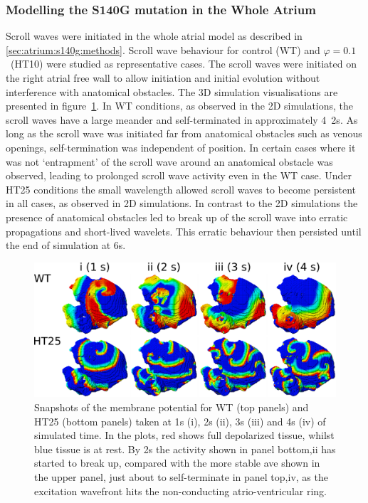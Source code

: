 \subsubsection{Modelling the S140G mutation in the Whole Atrium}

Scroll waves were initiated in the whole atrial model as described in
\ref{sec:atrium:s140g:methods}.
Scroll wave behaviour for control (WT) and $\varphi = 0.1$\ (HT10) were studied
as representative cases.
The scroll waves were initiated on the right atrial free wall to allow
initiation and initial evolution without interference with anatomical obstacles.
The 3D simulation visualisations are presented in
figure~\ref{atrium:iks:threed}.
In WT conditions, as observed in the 2D simulations, the scroll waves have a
large meander and self-terminated in approximately \unit{4.2}{s}.
As long as the scroll wave was initiated far from anatomical obstacles such as
venous openings, self-termination was independent of position.
In certain cases where it was not `entrapment' of the scroll wave around an
anatomical obstacle was observed, leading to prolonged scroll wave activity even
in the WT case.
Under HT25 conditions the small wavelength allowed scroll waves to become
persistent in all cases, as observed in 2D simulations.
In contrast to the 2D simulations the presence of anatomical obstacles led to break up of the
scroll wave into erratic propagations and short-lived wavelets.
This erratic behaviour then persisted until the end of simulation at
\unit{6}{s}.

\begin{figure}
\includegraphics{figures/atrium/iks/3D_Fig}
\caption[Snapshots of membrane potential over the whole atrium with S140G
mutation]{
\label{atrium:iks:threed}
Snapshots of the membrane potential for WT (top panels) and HT25 (bottom
panels) taken at \unit{1}{s} (i), \unit{2}{s} (ii), \unit{3}{s} (iii) and
\unit{4}{s} (iv) of simulated time.
In the plots, red shows full depolarized tissue, whilst blue tissue is at rest.
By \unit{2}{s} the activity shown in panel bottom,ii has started to break up, compared with
the more stable ave shown in the upper panel, just about to self-terminate in
panel top,iv, as the excitation wavefront hits the non-conducting atrio-ventricular
ring.
}
\end{figure}

